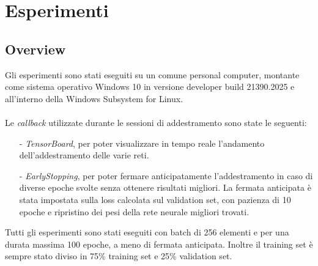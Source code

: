 \section{Esperimenti}
\subsection{Overview} 
Gli esperimenti sono stati eseguiti su un comune personal computer, montante come sistema operativo Windows 10 in versione developer build 21390.2025 e all'interno della Windows Subsystem for Linux.\\\\%
Le \textit{callback} utilizzate durante le sessioni di addestramento sono state le seguenti:
\begin{itemize}
    \item[-] \textit{TensorBoard}, per poter visualizzare in tempo reale l'andamento dell'addestramento delle varie reti.
    
    \item[-] \textit{EarlyStopping}, per poter fermare anticipatamente l'addestramento in caso di diverse epoche svolte senza ottenere risultati migliori. La fermata anticipata è stata impostata sulla loss calcolata sul validation set, con pazienza di 10 epoche e ripristino dei pesi della rete neurale migliori trovati.
    
\end{itemize}
Tutti gli esperimenti sono stati eseguiti con batch di 256 elementi e per una durata massima 100 epoche, a meno di fermata anticipata. Inoltre il training set è sempre stato diviso in 75\% training set e 25\% validation set.


